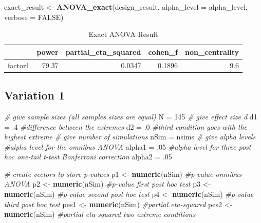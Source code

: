 \documentclass[]{book}
\newenvironment{Shaded}{\begin{snugshade}}{\end{snugshade}}
\newcommand{\CommentTok}[1]{\textcolor[rgb]{0.56,0.35,0.01}{\textit{#1}}}
\newcommand{\DataTypeTok}[1]{\textcolor[rgb]{0.13,0.29,0.53}{#1}}
\newcommand{\DecValTok}[1]{\textcolor[rgb]{0.00,0.00,0.81}{#1}}
\newcommand{\FloatTok}[1]{\textcolor[rgb]{0.00,0.00,0.81}{#1}}
\newcommand{\KeywordTok}[1]{\textcolor[rgb]{0.13,0.29,0.53}{\textbf{#1}}}
\newcommand{\NormalTok}[1]{#1}
\newcommand{\OtherTok}[1]{\textcolor[rgb]{0.56,0.35,0.01}{#1}}
\newcommand{\StringTok}[1]{\textcolor[rgb]{0.31,0.60,0.02}{#1}}
\begin{document}
\begin{Shaded}
\begin{Highlighting}[]
\NormalTok{exact_result <-}\StringTok{ }\KeywordTok{ANOVA_exact}\NormalTok{(design_result,}
                            \DataTypeTok{alpha_level =}\NormalTok{ alpha_level,}
                            \DataTypeTok{verbose =} \OtherTok{FALSE}\NormalTok{)}
\end{Highlighting}
\end{Shaded}

\begin{table}[t]

\caption{\label{tab:unnamed-chunk-55}Exact ANOVA Result}
\centering
\begin{tabular}{l|r|r|r|r}
\hline
  & power & partial\_eta\_squared & cohen\_f & non\_centrality\\
\hline
factor1 & 79.37 & 0.0347 & 0.1896 & 9.6\\
\hline
\end{tabular}
\end{table}

\hypertarget{variation-1}{%
\subsection{Variation 1}\label{variation-1}}

\begin{Shaded}
\begin{Highlighting}[]
\CommentTok{# give sample sizes (all samples sizes are equal)}
\NormalTok{N =}\StringTok{ }\DecValTok{145}
\CommentTok{# give effect size d}
\NormalTok{d1 =}\StringTok{ }\FloatTok{.4} \CommentTok{#difference between the extremes}
\NormalTok{d2 =}\StringTok{ }\FloatTok{.0} \CommentTok{#third condition goes with the highest extreme}
\CommentTok{# give number of simulations}
\NormalTok{nSim =}\StringTok{ }\NormalTok{nsims}
\CommentTok{# give alpha levels}
\CommentTok{#alpha level for the omnibus ANOVA}
\NormalTok{alpha1 =}\StringTok{ }\FloatTok{.05} 
\CommentTok{#alpha level for three post hoc one-tail t-test Bonferroni correction}
\NormalTok{alpha2 =}\StringTok{ }\FloatTok{.05} 
\end{Highlighting}
\end{Shaded}

\begin{Shaded}
\begin{Highlighting}[]
\CommentTok{# create vectors to store p-values}
\NormalTok{p1 <-}\StringTok{ }\KeywordTok{numeric}\NormalTok{(nSim) }\CommentTok{#p-value omnibus ANOVA}
\NormalTok{p2 <-}\StringTok{ }\KeywordTok{numeric}\NormalTok{(nSim) }\CommentTok{#p-value first post hoc test}
\NormalTok{p3 <-}\StringTok{ }\KeywordTok{numeric}\NormalTok{(nSim) }\CommentTok{#p-value second post hoc test}
\NormalTok{p4 <-}\StringTok{ }\KeywordTok{numeric}\NormalTok{(nSim) }\CommentTok{#p-value third post hoc test}
\NormalTok{pes1 <-}\StringTok{ }\KeywordTok{numeric}\NormalTok{(nSim) }\CommentTok{#partial eta-squared}
\NormalTok{pes2 <-}\StringTok{ }\KeywordTok{numeric}\NormalTok{(nSim) }\CommentTok{#partial eta-squared two extreme conditions}
\end{Highlighting}
\end{Shaded}
\end{document}
